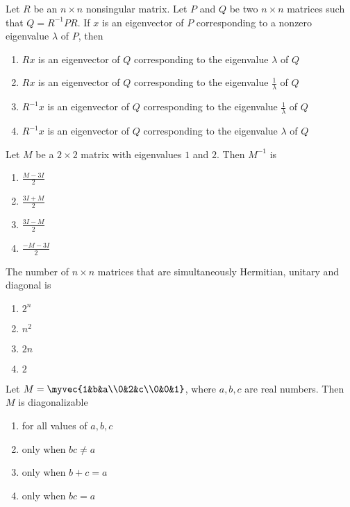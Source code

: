     \item Let $R$ be an $n \times n$ nonsingular matrix. Let $P$ and $Q$ be two $n \times n$ matrices such
    that $Q= R^{-1}PR$. If $x$ is an eigenvector of $P$ corresponding to a nonzero eigenvalue $\lambda$ of $P$, then
        \begin{enumerate}
            \item $Rx$ is an eigenvector of $Q$ corresponding to the eigenvalue $\lambda$ of $Q$
            \item $Rx$ is an eigenvector of $Q$ corresponding to the eigenvalue $\frac{1}{\lambda}$ of $Q$
            \item $R^{-1}x$ is an eigenvector of $Q$ corresponding to the eigenvalue $\frac{1}{\lambda}$ of $Q$
            \item $R^{-1}x$ is an eigenvector of $Q$ corresponding to the eigenvalue $\lambda$ of $Q$
        \end{enumerate}

    \item Let $M$ be a $2 \times 2$ matrix with eigenvalues $1$ and $2$. Then $M^{-1}$ is
        \begin{enumerate}
            \item $\frac{M-3I}{2}$
            \item $\frac{3I+M}{2}$
            \item $\frac{3I-M}{2}$
            \item $\frac{-M-3I}{2}$
        \end{enumerate}

    \item The number of $n \times n$ matrices that are simultaneously Hermitian, unitary and diagonal is
        \begin{enumerate}
            \item $2^n$
            \item $n^2$
            \item $2n$
            \item $2$
        \end{enumerate}

    \item Let $M = \myvec{1&b&a\\0&2&c\\0&0&1}$, where $a,b,c$ are real numbers. Then $M$ is diagonalizable 
        \begin{enumerate}
            \item for all values of $a,b,c$
            \item only when $bc \neq a$
            \item only when $b+c=a$
            \item only when $bc=a$
        \end{enumerate}

